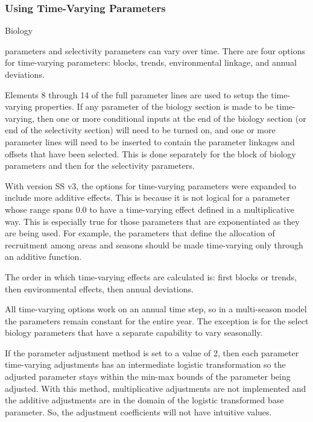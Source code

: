 \hypertarget{TVpara}{}
\subsubsection{Using Time-Varying Parameters}
\hypertarget{TVpara}{Biology} parameters and selectivity parameters can vary over time.  There are four options for time-varying parameters:  blocks, trends, environmental linkage, and annual deviations.

Elements 8 through 14 of the full parameter lines are used to setup the time-varying properties.  If any parameter of the biology section is made to be time-varying, then one or more conditional inputs at the end of the biology section (or end of the selectivity section) will need to be turned on, and one or more parameter lines will need to be inserted to contain the parameter linkages and offsets that have been selected.  This is done separately for the block of biology parameters and then for the selectivity parameters.

With version SS v3, the options for time-varying parameters were expanded to include more additive effects.  This is because it is not logical for a parameter whose range spans 0.0 to have a time-varying effect defined in a multiplicative way.  This is especially true for those parameters that are exponentiated as they are being used.  For example, the parameters that define the allocation of recruitment among areas and seasons should be made time-varying only through an additive function.

The order in which time-varying effects are calculated is:  first blocks or trends, then environmental effects, then annual deviations.

All time-varying options work on an annual time step, so in a multi-season model the parameters remain constant for the entire year.  The exception is for the select biology parameters that have a separate capability to vary seasonally.

If the parameter adjustment method is set to a value of 2, then each parameter time-varying adjustments has an intermediate logistic transformation so the adjusted parameter stays within the min-max bounds of the parameter being adjusted.  With this method, multiplicative adjustments are not implemented and the additive adjustments are in the domain of the logistic transformed base parameter.  So, the adjustment coefficients will not have intuitive values.

